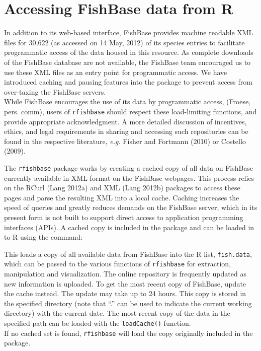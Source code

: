 \section{Accessing FishBase data from R}

In addition to its web-based interface, FishBase provides machine
readable XML files for 30,622 (as accessed on 14 May, 2012) of its
species entries to facilitate programmatic access of the data housed in
this resource. As complete downloads of the FishBase database are not
available, the FishBase team encouraged us to use these XML files as an
entry point for programmatic access. We have introduced caching and
pausing features into the package to prevent access from over-taxing the
FishBase servers.\\While FishBase encourages the use of its data by
programmatic access, (Froese, pers. comm), users of \texttt{rfishbase}
should respect these load-limiting functions, and provide appropriate
acknowledgment. A more detailed discussion of incentives, ethics, and
legal requirements in sharing and accessing such repositories can be
found in the respective literature, \emph{e.g.} Fisher and Fortmann
(2010) or Costello (2009).

The \texttt{rfishbase} package works by creating a cached copy of all
data on FishBase currently available in XML format on the FishBase
webpages. This process relies on the RCurl (Lang 2012a) and XML (Lang
2012b) packages to access these pages and parse the resulting XML into a
local cache. Caching increases the speed of queries and greatly reduces
demands on the FishBase server, which in its present form is not built
to support direct access to application programming interfaces (APIs). A
cached copy is included in the package and can be loaded in to R using
the command:

\begin{Shaded}
\begin{Highlighting}[]
\end{Highlighting}
\end{Shaded}
This loads a copy of all available data from FishBase into the R list,
\texttt{fish.data}, which can be passed to the various functions of
\texttt{rfishbase} for extraction, manipulation and visualization. The
online repository is frequently updated as new information is uploaded.
To get the most recent copy of FishBase, update the cache instead. The
update may take up to 24 hours. This copy is stored in the specified
directory (note that ``.'' can be used to indicate the current working
directory) with the current date. The most recent copy of the data in
the specified path can be loaded with the \texttt{loadCache()}
function.\\If no cached set is found, \texttt{rfishbase} will load the
copy originally included in the package.

